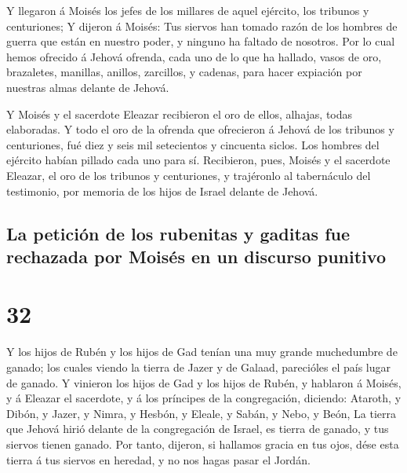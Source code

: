  Y llegaron á Moisés los jefes de los millares de aquel
ejército, los tribunos y centuriones;  Y dijeron á
Moisés: Tus siervos han tomado razón de los hombres de guerra que están
en nuestro poder, y ninguno ha faltado de nosotros.  Por
lo cual hemos ofrecido á Jehová ofrenda, cada uno de lo que ha hallado,
vasos de oro, brazaletes, manillas, anillos, zarcillos, y cadenas, para
hacer expiación por nuestras almas delante de Jehová.

 Y Moisés y el sacerdote Eleazar recibieron el oro de
ellos, alhajas, todas elaboradas.  Y todo el oro de la
ofrenda que ofrecieron á Jehová de los tribunos y centuriones, fué diez
y seis mil setecientos y cincuenta siclos.  Los hombres
del ejército habían pillado cada uno para sí. 
Recibieron, pues, Moisés y el sacerdote Eleazar, el oro de los tribunos
y centuriones, y trajéronlo al tabernáculo del testimonio, por memoria
de los hijos de Israel delante de Jehová.

\hypertarget{la-peticiuxf3n-de-los-rubenitas-y-gaditas-fue-rechazada-por-moisuxe9s-en-un-discurso-punitivo}{%
\subsection{La petición de los rubenitas y gaditas fue rechazada por
Moisés en un discurso
punitivo}\label{la-peticiuxf3n-de-los-rubenitas-y-gaditas-fue-rechazada-por-moisuxe9s-en-un-discurso-punitivo}}

\hypertarget{section-04-32}{%
\section{32}\label{section-04-32}}

 Y los hijos de Rubén y los hijos de Gad tenían una muy
grande muchedumbre de ganado; los cuales viendo la tierra de Jazer y de
Galaad, parecióles el país lugar de ganado.  Y vinieron
los hijos de Gad y los hijos de Rubén, y hablaron á Moisés, y á Eleazar
el sacerdote, y á los príncipes de la congregación, diciendo:
 Ataroth, y Dibón, y Jazer, y Nimra, y Hesbón, y Eleale, y
Sabán, y Nebo, y Beón,  La tierra que Jehová hirió delante
de la congregación de Israel, es tierra de ganado, y tus siervos tienen
ganado.  Por tanto, dijeron, si hallamos gracia en tus
ojos, dése esta tierra á tus siervos en heredad, y no nos hagas pasar el
Jordán.


